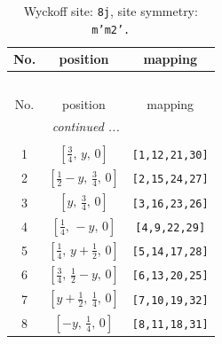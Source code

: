 \documentclass[fleqn,8pt]{jsarticle}
\begin{document}
\begin{longtable}{ccc}
\caption{Wyckoff site: {\tt 8j}, site symmetry: {\tt m'm2'.}}
 \\
 \hline \hline
No. & position & mapping \\ \hline \endfirsthead

\multicolumn{2}{l}{\tablename\ \thetable{}} \\
 \hline \hline
No. & position & mapping \\ \hline \endhead

 \hline \hline
\multicolumn{2}{r}{\footnotesize\it continued ...} \\ \endfoot

 \hline \hline
\multicolumn{2}{r}{} \\ \endlastfoot

1 & $\left[ \frac{3}{4},\, y,\, 0 \right]$ & {\tt [1,12,21,30]} \\ \hline
2 & $\left[ \frac{1}{2} - y,\, \frac{3}{4},\, 0 \right]$ & {\tt [2,15,24,27]} \\ \hline
3 & $\left[ y,\, \frac{3}{4},\, 0 \right]$ & {\tt [3,16,23,26]} \\ \hline
4 & $\left[ \frac{1}{4},\, - y,\, 0 \right]$ & {\tt [4,9,22,29]} \\ \hline
5 & $\left[ \frac{1}{4},\, y + \frac{1}{2},\, 0 \right]$ & {\tt [5,14,17,28]} \\ \hline
6 & $\left[ \frac{3}{4},\, \frac{1}{2} - y,\, 0 \right]$ & {\tt [6,13,20,25]} \\ \hline
7 & $\left[ y + \frac{1}{2},\, \frac{1}{4},\, 0 \right]$ & {\tt [7,10,19,32]} \\ \hline
8 & $\left[ - y,\, \frac{1}{4},\, 0 \right]$ & {\tt [8,11,18,31]} \\
\end{longtable}
\renewcommand{\arraystretch}{1.2}
\end{document}
